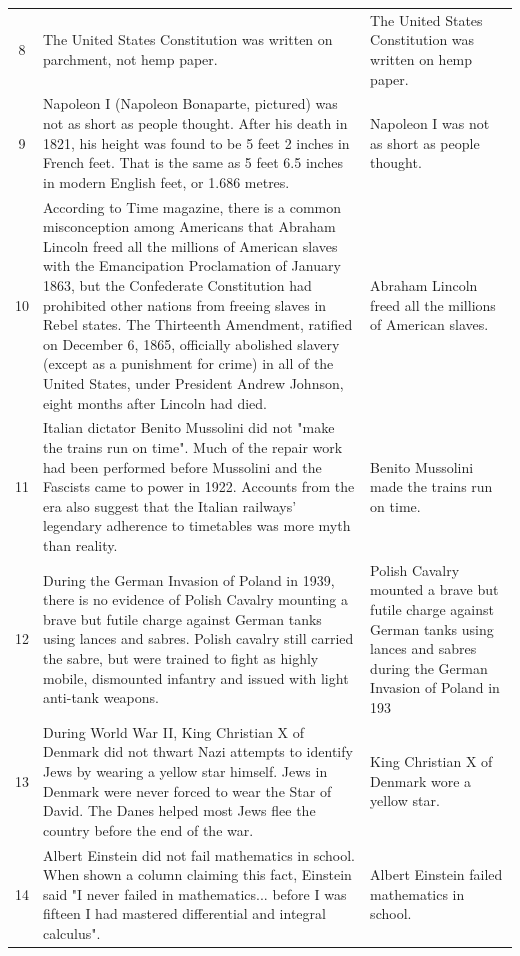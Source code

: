 \begin{tabular}{c|p{}|p{}}
8 & The United States Constitution was written on parchment, not hemp paper. & The United States Constitution was written on hemp paper. \\
9 & Napoleon I (Napoleon Bonaparte, pictured) was not as short as people thought. After his death in 1821, his height was found to be 5 feet 2 inches in French feet. That is the same as 5 feet 6.5 inches in modern English feet, or 1.686 metres. & Napoleon I was not as short as people thought. \\
10 & According to Time magazine, there is a common misconception among Americans that Abraham Lincoln freed all the millions of American slaves with the Emancipation Proclamation of January 1863, but the Confederate Constitution had prohibited other nations from freeing slaves in Rebel states. The Thirteenth Amendment, ratified on December 6, 1865, officially abolished slavery (except as a punishment for crime) in all of the United States, under President Andrew Johnson, eight months after Lincoln had died. & Abraham Lincoln freed all the millions of American slaves. \\
11 & Italian dictator Benito Mussolini did not "make the trains run on time". Much of the repair work had been performed before Mussolini and the Fascists came to power in 1922. Accounts from the era also suggest that the Italian railways' legendary adherence to timetables was more myth than reality. & Benito Mussolini made the trains run on time. \\
12 & During the German Invasion of Poland in 1939, there is no evidence of Polish Cavalry mounting a brave but futile charge against German tanks using lances and sabres. Polish cavalry still carried the sabre, but were trained to fight as highly mobile, dismounted infantry and issued with light anti-tank weapons. & Polish Cavalry mounted a brave but futile charge against German tanks using lances and sabres during the German Invasion of Poland in 193 \\
13 & During World War II, King Christian X of Denmark did not thwart Nazi attempts to identify Jews by wearing a yellow star himself. Jews in Denmark were never forced to wear the Star of David. The Danes helped most Jews flee the country before the end of the war. & King Christian X of Denmark wore a yellow star. \\
14 & Albert Einstein did not fail mathematics in school. When shown a column claiming this fact, Einstein said "I never failed in mathematics... before I was fifteen I had mastered differential and integral calculus". & Albert Einstein failed mathematics in school. \\

\end{tabular}
